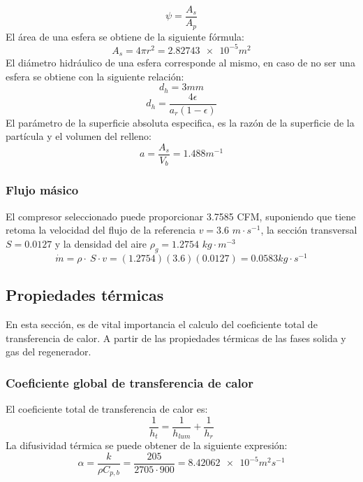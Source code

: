 \documentclass[12pt,letterpaper,final]{article}%
\begin{document}
\begin{equation}
	\psi = \frac{A_s}{A_p}
\end{equation}
El área de una esfera se obtiene de la siguiente fórmula:
\begin{equation*}
	A_s = 4 \pi r^2 = \num{2.82743e-5} m^2
\end{equation*}
El diámetro hidráulico de una esfera corresponde al mismo, en caso de no ser una esfera se obtiene con la siguiente relación:
\begin{equation*}
	d_h= 3mm
\end{equation*}
\begin{equation*}
	d_h= \frac{4\epsilon}{a_r(1-\epsilon)}
\end{equation*}
El parámetro de la superficie absoluta especifica, es la razón de la superficie de la partícula y el volumen del relleno:
\begin{equation*}
	a = \frac{A_s}{V_b} = 1.488 m^{-1}
\end{equation*}
\subsubsection*{Flujo másico}
El compresor seleccionado puede proporcionar 3.7585 CFM, suponiendo que tiene retoma la velocidad del flujo de la referencia\cite{Kilkovsky2020} $v=3.6 $ $m\cdot s^{-1}$, la sección transversal $S=0.0127$ y la densidad del aire $\rho_g =1.2754 $ $kg \cdot m^{-3}$
\begin{equation*}
	\dot m = \rho \cdot \ S \cdot v = (1.2754)(3.6)(0.0127) =  0.0583 kg \cdot s^{-1}
\end{equation*}
\subsection{Propiedades térmicas}
En esta sección, es de vital importancia el calculo del coeficiente total de transferencia de calor. A partir de las propiedades térmicas de las fases solida y gas del regenerador.
\newline
\subsubsection{Coeficiente global de transferencia de calor}
El coeficiente total de transferencia de calor es:
\begin{equation*}
	\frac{1}{h_t} = \frac{1}{h_{lum}} + \frac{1}{h_r} 
\end{equation*}
La difusividad térmica se puede obtener de la siguiente expresión:
\begin{equation*}
	\alpha = \frac{k}{\rho C_{p,b}} = \frac{205}{2705 \cdot 900 } = \num{8.42062e-5} m^2 s^{-1} 
\end{equation*}
\end{document}
